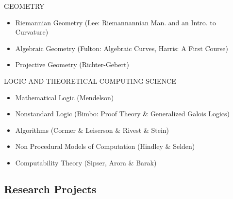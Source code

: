 \documentclass{friggeri-cv}
\begin{document}
\begin{entrylist}

\entries
{GEOMETRY}
{
\begin{itemize}
    \setlength\itemsep{-1em}
    \item Riemannian Geometry (Lee: Riemannannian Man. and an Intro. to Curvature)\\
    \item Algebraic Geometry (Fulton: Algebraic Curves, Harris: A First Course)\\
    \item Projective Geometry (Richter-Gebert)
\end{itemize}
}


\entries
{LOGIC AND THEORETICAL COMPUTING SCIENCE}
{
\begin{itemize}
    \setlength\itemsep{-1em}
    \item Mathematical Logic (Mendelson)\\
    \item Nonstandard Logic (Bimbo: Proof Theory \& Generalized Galois Logics)\\
    \item Algorithms (Cormer \& Leiserson \& Rivest \& Stein)\\
    \item Non Procedural Models of Computation (Hindley \& Selden)\\
    \item Computability Theory (Sipser, Arora \& Barak)
\end{itemize}
}


\end{entrylist}

\pagebreak[4]
\subsection{Research Projects}
\end{document}
